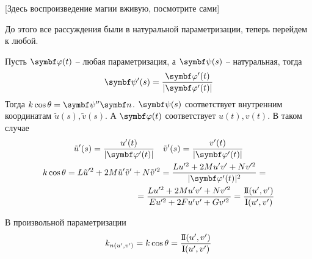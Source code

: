 \documentclass[main]{subfiles}
\begin{document}
[Здесь воспроизведение магии вживую, посмотрите сами]

До этого все рассуждения были в натуральной параметризации, теперь перейдем к любой.

Пусть $\vphi(t)$ -- любая параметризация, а $\vpsi(s)$ -- натуральная, тогда
\[\vpsi'(s) = \frac{\vphi'(t)}{|\vphi'(t)|}\]
Тогда  $k \cos\theta = \vpsi'' \vn$.
$\vpsi(s)$ соответствует внутренним координатам $\tilde{u}(s), \tilde{v}(s)$.
А $\vphi(t)$ соответствует $u(t), v(t)$.
В таком случае
\begin{gather*}
    \tilde{u}'(s) = \frac{u'(t)}{|\vphi'(t)|} \quad \tilde{v}'(s) =\frac{v'(t)}{|\vphi'(t)|}\\
    \begin{multlined}
        k \cos \theta = L \tilde{u}'^2 + 2M \tilde{u}' \tilde{v}' + N \tilde{v}'^2 = \frac{L u'^2 + 2M u'v' + Nv'^2}{|\vphi'(t)|^2} =\\
        = \frac{L u'^2 + 2M u'v' + Nv'^2}{Eu'^2 + 2F u'v' + G v'^2} = \frac{\sff(u',v')}{\fff(u',v')}
    \end{multlined}
\end{gather*}
\begin{theorem}
    В произвольной параметризации
    \[k_{n(u', v')} = k \cos \theta = \frac{\mathrm{I\!I}(u',v')}{\mathrm{I}(u',v')}\]
\end{theorem}
\end{document}
